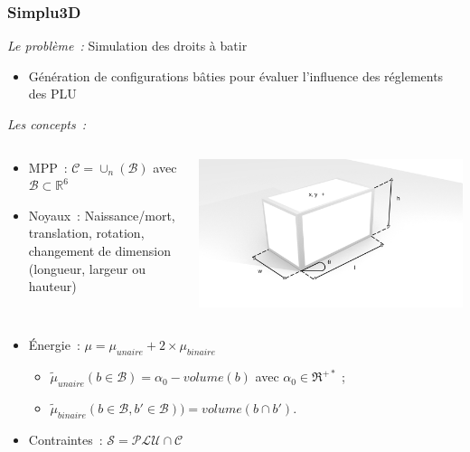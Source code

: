 \documentclass{beamer}
\begin{document}
\begin{frame}
\frametitle{Simplu3D}
\emph{Le probl\`eme~:}  Simulation des droits \`a batir
\begin{itemize}
\item Génération de configurations bâties pour évaluer l'influence des réglements des PLU
\end{itemize}
\emph{Les concepts~:}



\begin{columns}
\begin{column}{0.55\textwidth}
\begin{itemize}
\item MPP~:  $ \mathcal{C} =\cup_{n}( \mathcal{B})$  avec $\mathcal{B}  \subset  \mathds{R}^{6}$
\item Noyaux~: Naissance/mort, translation, rotation, changement de dimension (longueur, largeur ou hauteur)
\end{itemize}
\end{column}
\begin{column}{0.45\textwidth}
 \includegraphics[width=\textwidth]{boiteFin.png}
\end{column}
\end{columns}
\begin{itemize}
\item Énergie~: $\mu = \mu_{unaire} + 2 \times \mu_{binaire}$
\begin{itemize}
\item $\tilde \mu_{unaire}(b \in \mathcal{B})=\alpha_{0} - volume(b)$ avec $\alpha_{0} \in \Re^{+*}$ ;
\item $\tilde \mu_{binaire}(b \in \mathcal{B}, b' \in \mathcal{B})) = volume(b \cap b')$.
\end{itemize}
\item Contraintes~:  $ \mathcal{S} = \mathcal{PLU} \cap  \mathcal{C}   $
\end{itemize}


\end{frame}
\end{document}
